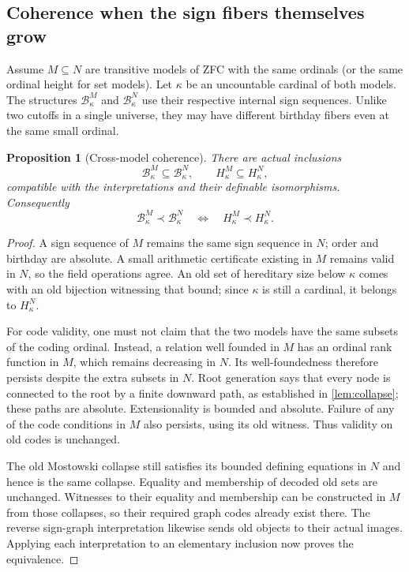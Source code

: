 \documentclass[11pt,letterpaper]{article}
\newtheorem{proposition}[theorem]{Proposition}
\theoremstyle{definition}
\theoremstyle{remark}
\newcommand{\B}{\mathcal B}
\begin{document}
\subsection{Coherence when the sign fibers themselves grow}

Assume $M\subseteq N$ are transitive models of ZFC with the same ordinals
(or the same ordinal height for set models). Let $\kappa$ be an uncountable
cardinal of both models. The structures $\B_\kappa^M$ and $\B_\kappa^N$
use their respective internal sign sequences. Unlike two cutoffs in a single
universe, they may have different birthday fibers even at the same small
ordinal.

\begin{proposition}[Cross-model coherence]
\label{prop:cross-model}
There are actual inclusions
\[
 \B_\kappa^M\subseteq\B_\kappa^N,
 \qquad H_\kappa^M\subseteq H_\kappa^N,
\]
compatible with the interpretations and their definable isomorphisms.
Consequently
\[
 \B_\kappa^M\prec\B_\kappa^N
 \quad\Longleftrightarrow\quad H_\kappa^M\prec H_\kappa^N.
\]
\end{proposition}
\begin{proof}
A sign sequence of $M$ remains the same sign sequence in $N$; order and
birthday are absolute. A small arithmetic certificate existing in $M$
remains valid in $N$, so the field operations agree. An old set of hereditary
size below $\kappa$ comes with an old bijection witnessing that bound; since
$\kappa$ is still a cardinal, it belongs to $H_\kappa^N$.

For code validity, one must not claim that the two models have the same
subsets of the coding ordinal. Instead, a relation well founded in $M$ has
an ordinal rank function in $M$, which remains decreasing in $N$. Its
well-foundedness therefore persists despite the extra subsets in $N$.
Root generation says that every node is connected to the root by a finite
downward path, as established in \cref{lem:collapse}; these paths are
absolute. Extensionality is bounded and absolute. Failure of any of the
code conditions in $M$ also persists, using its old witness. Thus validity
on old codes is unchanged.

The old Mostowski collapse still satisfies its bounded defining equations
in $N$ and hence is the same collapse. Equality and membership of decoded
old sets are unchanged. Witnesses to their equality and membership can be
constructed in $M$ from those collapses, so their required graph codes
already exist there. The reverse sign-graph interpretation likewise sends
old objects to their actual images. Applying each interpretation to an
elementary inclusion now proves the equivalence.
\end{proof}
\end{document}
